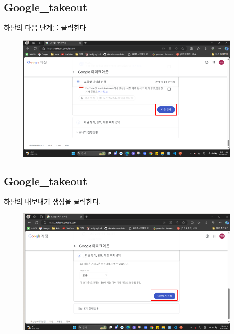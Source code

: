 \documentclass{oblivoir}
\begin{document}
  \subsection{Google\_takeout}
  하단의 다음 단계를 클릭한다.
  \begin{figure}[H]
    \includegraphics[width=\textwidth]{Google_takeout_4.png}
  \end{figure}      
  \subsection{Google\_takeout}
  하단의 내보내기 생성을 클릭한다.
  \begin{figure}[H]
    \includegraphics[width=\textwidth]{Google_takeout_5.png}
  \end{figure}     
\end{document}
